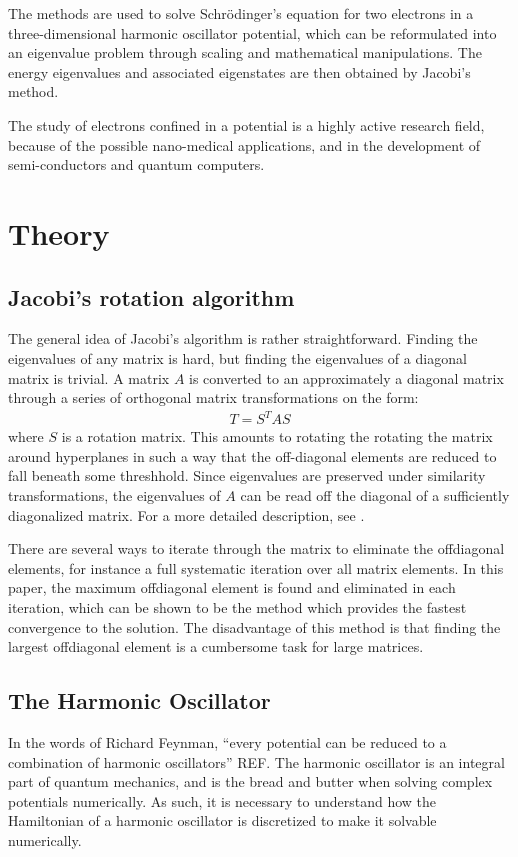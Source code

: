 \documentclass[aps,reprint]{revtex4-1}
\begin{document}
The methods are used to solve Schrödinger's equation for two electrons in a
three-dimensional harmonic oscillator potential, which can be reformulated into
an eigenvalue problem through scaling and mathematical manipulations. The
energy eigenvalues and associated eigenstates are then obtained by Jacobi's method.

The study of electrons confined in a potential is a highly active research field,
because of the possible nano-medical applications, and in the development of semi-conductors
and quantum computers.
\section{Theory}
\label{sec:theory}
\subsection{Jacobi's rotation algorithm}
The general idea of Jacobi's algorithm is rather straightforward. Finding the
eigenvalues of any matrix is hard, but finding the eigenvalues of a diagonal
matrix is trivial. A matrix \(A\) is converted to an approximately a diagonal
matrix through a series of orthogonal matrix transformations on the form:
\begin{align*}
  T = S^T A S
\end{align*}
where $S$ is a rotation matrix. This amounts to rotating the rotating the matrix
around hyperplanes in such a way that the off-diagonal elements are reduced to
fall beneath some threshhold.
Since eigenvalues are preserved under similarity
transformations, the eigenvalues of \(A\) can be read off the diagonal of a
sufficiently diagonalized matrix. For a more detailed description, see \cite{mortenjensen}.

There are several ways to iterate through the matrix to eliminate the offdiagonal
elements, for instance a full systematic iteration over all matrix elements. In this paper,
the maximum offdiagonal element is found and eliminated in each iteration, which can be shown to be
the method which provides the fastest convergence to the solution. The disadvantage of this method
is that finding the largest offdiagonal element is a cumbersome task for large matrices.
\subsection{The Harmonic Oscillator}
\label{sec:harmonic}
In the words of Richard Feynman, ``every potential can be reduced to a
combination of harmonic oscillators'' REF. The harmonic oscillator is an
integral part of quantum mechanics, and is the bread and butter when solving
complex potentials numerically. As such, it is necessary to understand how the
Hamiltonian of a harmonic oscillator is discretized to make it solvable
numerically.
\end{document}
